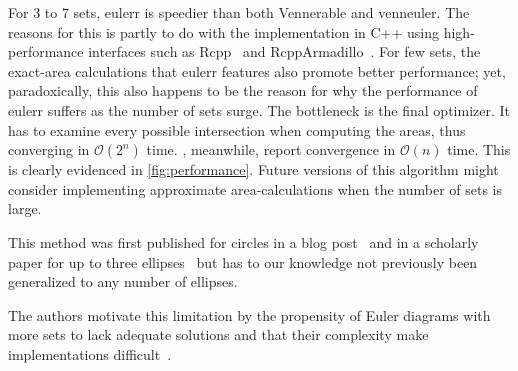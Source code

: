 \documentclass[
  a4paper,
  nofonts,
  nobib,
  nohyper,
  openany
]{tufte-book}\usepackage[]{graphicx}\usepackage[]{color}
\newcommand{\pkg}[1]{{\fontseries{b}\selectfont #1}}
\begin{document}
For 3 to 7 sets, \pkg{eulerr} is speedier than both \pkg{Vennerable} and \pkg{venneuler}. The reasons for this is partly to do with the implementation in C++ using high-performance interfaces such as \pkg{Rcpp}~\citep{eddelbuettel_2011} and \pkg{RcppArmadillo}~\citep{eddelbuettel_2014}. For few sets, the exact-area calculations that \pkg{eulerr} features also promote better performance; yet, paradoxically, this also happens to be the reason for why the performance of \pkg{eulerr} suffers as the number of sets surge. The bottleneck is the final optimizer. It has to examine every possible intersection when computing the areas, thus converging in $\mathcal{O}(2^n)$ time. \citet{wilkinson_2012}, meanwhile, report convergence in $\mathcal{O}(n)$ time. This is clearly evidenced in \cref{fig:performance}. Future versions of this algorithm might consider implementing approximate area-calculations when the number of sets is large.

This method was first published for circles in a blog post~\citep{frederickson_2013} and in a scholarly paper for up to three ellipses~\citep{micaleff_2013} but has to our knowledge not previously been generalized to any number of ellipses.

The authors motivate this limitation by the propensity of Euler diagrams with more sets to lack adequate solutions and that their complexity make implementations difficult~\citep{micallef_2013}.
\end{document}
